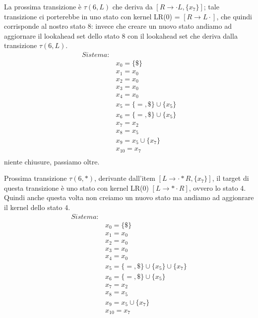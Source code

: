 \documentclass[class=book, crop=false, oneside, 12pt]{standalone}
\begin{document}
La prossima transizione è \(\tau(6, L)\) che deriva da \([R \to \cdot L, \{x_7\}]\); tale transizione ci porterebbe in uno stato con kernel LR(0) = \([R \to L \cdot ]\), che quindi corrisponde al nostro stato 8: invece che creare un nuovo stato andiamo ad aggiornare il lookahead set dello stato 8 con il lookahead set che deriva dalla transizione \(\tau(6, L)\).
\begin{align*}
    Sistema:& \\
            & x_0 = \{\$\} \\
            & x_1 = x_0 \\
            & x_2 = x_0 \\
            & x_3 = x_0 \\
            & x_4 = x_0 \\
            & x_5 = \{=, \$\} \cup \{x_5\} \\
            & x_6 = \{=, \$\} \cup \{x_5\} \\
            & x_7 = x_2 \\
            & x_8 = x_5 \\
            & x_9 = x_5 \cup \{x_7\} \\
            & x_{10} = x_7 \\
\end{align*}
niente chiusure, passiamo oltre.

Prossima transizione \(\tau(6, *)\), derivante dall'item \([L \to \cdot * R, \{x_7\}]\), il target di questa transizione è uno stato con kernel LR(0) \([L \to *\cdot R]\), ovvero lo stato 4. Quindi anche questa volta non creiamo un nuovo stato ma andiamo ad aggionrare il kernel dello stato 4.
\begin{align*}
    Sistema:& \\
            & x_0 = \{\$\} \\
            & x_1 = x_0 \\
            & x_2 = x_0 \\
            & x_3 = x_0 \\
            & x_4 = x_0 \\
            & x_5 = \{=, \$\} \cup \{x_5\} \cup \{x_7\} \\
            & x_6 = \{=, \$\} \cup \{x_5\} \\
            & x_7 = x_2 \\
            & x_8 = x_5 \\
            & x_9 = x_5 \cup \{x_7\} \\
            & x_{10} = x_7 \\
\end{align*}
\end{document}
